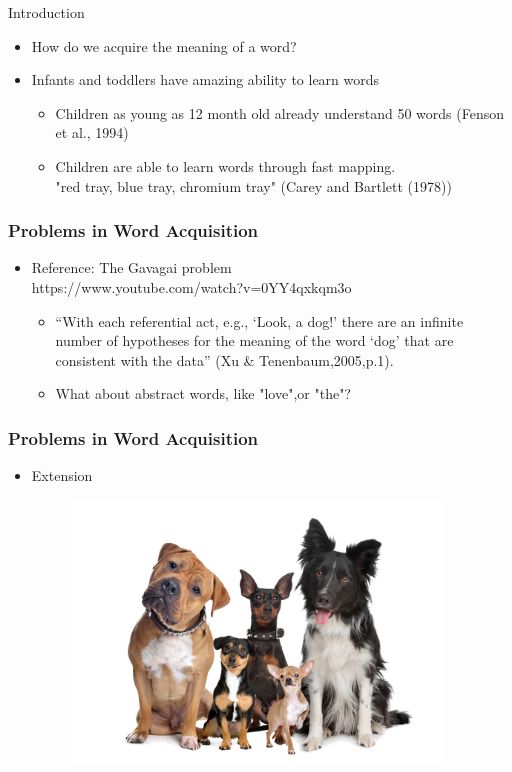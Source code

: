 \documentclass{beamer}
\begin{document}
\begin{frame}{Introduction}
\begin{itemize}
\item How do we acquire the meaning of a word? 
\pause 
\item Infants and toddlers have amazing ability to learn words
\begin{itemize}
    \item Children as young as 12 month old already understand 50 words (Fenson et al., 1994)
    \item Children are able to learn words through fast mapping. 
    \\ "red tray, blue tray, chromium tray" (Carey and Bartlett (1978))
\end{itemize}

\end{itemize}
\end{frame}
\begin{frame}
\frametitle{Problems in Word Acquisition}
\begin{itemize}
\item Reference: The Gavagai problem
\\ https://www.youtube.com/watch?v=0YY4qxkqm3o 
\begin{itemize}
    \item  “With each referential act, e.g., ‘Look, a dog!’ there are an infinite number of hypotheses for the meaning of the word ‘dog’ that are consistent with the data” (Xu & Tenenbaum,2005,p.1).
    \pause
    \item What about abstract words, like "love",or "the"?
\end{itemize}
\end{itemize}
\end{frame}
\begin{frame}
\frametitle{Problems in Word Acquisition}
\begin{itemize}
\item Extension
\begin{figure}
    \includegraphics[height = 7cm, keepaspectratio]{diffeent-types-of-dog-breeds.jpg}
\end{figure}
\end{itemize}
\end{frame}
\end{document}
